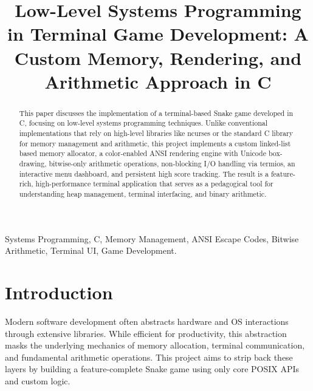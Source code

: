\documentclass[conference]{IEEEtran}
\begin{document}
\title{Low-Level Systems Programming in Terminal Game Development: A Custom Memory, Rendering, and Arithmetic Approach in C}

\author{
\and
{}
}

\maketitle

\begin{abstract}
This paper discusses the implementation of a terminal-based Snake game developed in C, focusing on low-level systems programming techniques. Unlike conventional implementations that rely on high-level libraries like ncurses or the standard C library for memory management and arithmetic, this project implements a custom linked-list based memory allocator, a color-enabled ANSI rendering engine with Unicode box-drawing, bitwise-only arithmetic operations, non-blocking I/O handling via termios, an interactive menu dashboard, and persistent high score tracking. The result is a feature-rich, high-performance terminal application that serves as a pedagogical tool for understanding heap management, terminal interfacing, and binary arithmetic.
\end{abstract}

\begin{IEEEkeywords}
Systems Programming, C, Memory Management, ANSI Escape Codes, Bitwise Arithmetic, Terminal UI, Game Development.
\end{IEEEkeywords}

\section{Introduction}
Modern software development often abstracts hardware and OS interactions through extensive libraries. While efficient for productivity, this abstraction masks the underlying mechanics of memory allocation, terminal communication, and fundamental arithmetic operations. This project aims to strip back these layers by building a feature-complete Snake game using only core POSIX APIs and custom logic.
\end{document}
